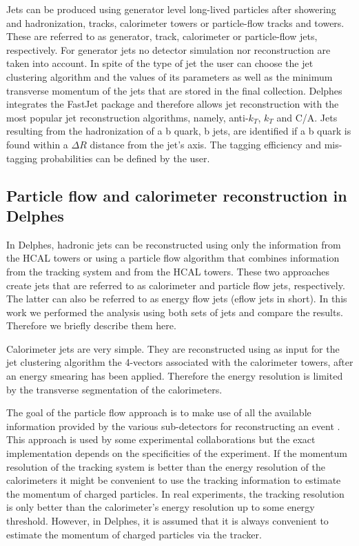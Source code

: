 Jets can be produced using generator level long-lived particles after showering and hadronization, tracks, calorimeter towers or particle-flow tracks and towers. These are referred to as generator, track, calorimeter or particle-flow jets, respectively. For generator jets no detector simulation nor reconstruction are taken into account. In spite of the type of jet the user can choose the jet clustering algorithm and the values of its parameters as well as the minimum transverse momentum of the jets that are stored in the final collection. Delphes integrates the FastJet package \cite{fastjet} and therefore allows jet reconstruction with the most popular jet reconstruction algorithms, namely, anti-$k_T$, $k_T$ and C/A. 
Jets resulting from the hadronization of a b quark, b jets, are identified if a b quark is found within a $\Delta R$ distance from the jet's axis. The tagging efficiency and mis-tagging probabilities can be defined by the user. 

\subsection{Particle flow and calorimeter reconstruction in Delphes}

In Delphes, hadronic jets can be reconstructed using only the information from the HCAL towers or using a particle flow algorithm that combines information from the tracking system and from the HCAL towers. These two approaches create jets that are referred to as calorimeter and particle flow jets, respectively. The latter can also be referred to as energy flow jets (eflow jets in short). In this work we performed the analysis using both sets of jets and compare the results. Therefore we briefly describe them here.

Calorimeter jets are very simple. They are reconstructed using as input for the jet clustering algorithm the 4-vectors associated with the calorimeter towers, after an energy smearing has been applied. Therefore the energy resolution is limited by the transverse segmentation of the calorimeters.

The goal of the particle flow approach is to make use of all the available information provided by the various sub-detectors for reconstructing an event \cite{Delphes}. This approach is used by some experimental collaborations \cite{PF1,PF2} but the exact implementation depends on the specificities of the experiment. If the momentum resolution of the tracking system is better than the energy resolution of the calorimeters it might be convenient to use the tracking information to estimate the momentum of charged particles. In real experiments, the tracking resolution is only better than the calorimeter's energy resolution up to some energy threshold. However, in Delphes, it is assumed that it is always convenient to estimate the momentum of charged particles via the tracker. 


